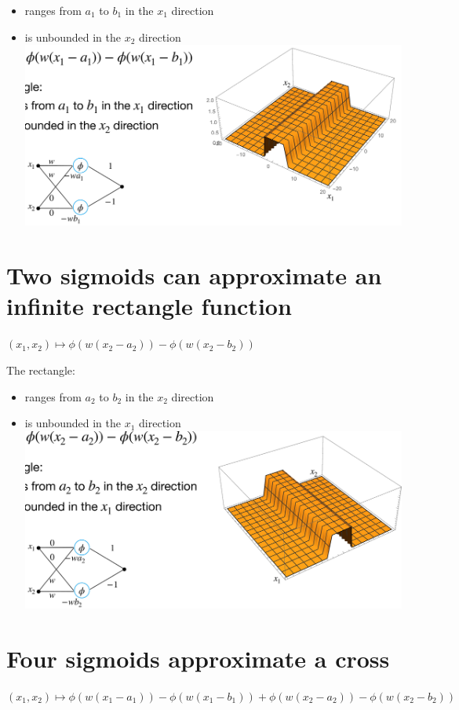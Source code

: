 \documentclass[10pt]{article}
\begin{document}
\begin{itemize}
  \item ranges from $a_{1}$ to $b_{1}$ in the $x_{1}$ direction
  \item is unbounded in the $x_{2}$ direction
\includegraphics[max width=\textwidth, center]{2024_01_08_0e0dcffe4bc8c6049046g-28}
\end{itemize}

\section*{Two sigmoids can approximate an infinite rectangle function}
$\left(x_{1}, x_{2}\right) \mapsto \phi\left(w\left(x_{2}-a_{2}\right)\right)-\phi\left(w\left(x_{2}-b_{2}\right)\right)$

The rectangle:

\begin{itemize}
  \item ranges from $a_{2}$ to $b_{2}$ in the $x_{2}$ direction
  \item is unbounded in the $x_{1}$ direction
\includegraphics[max width=\textwidth, center]{2024_01_08_0e0dcffe4bc8c6049046g-29}
\end{itemize}

\section*{Four sigmoids approximate a cross}
$\left(x_{1}, x_{2}\right) \mapsto \phi\left(w\left(x_{1}-a_{1}\right)\right)-\phi\left(w\left(x_{1}-b_{1}\right)\right)+\phi\left(w\left(x_{2}-a_{2}\right)\right)-\phi\left(w\left(x_{2}-b_{2}\right)\right)$
\end{document}
